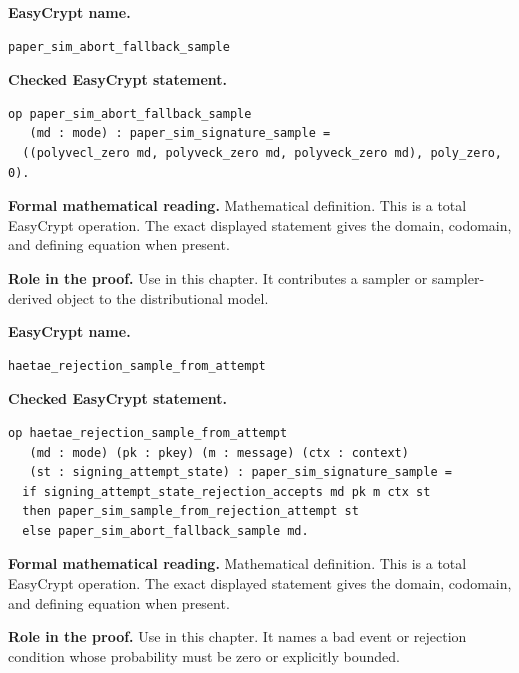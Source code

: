 \begin{formaldefinition}
\noindent\textbf{EasyCrypt name.}
\begin{lstlisting}[language=EasyCrypt,basicstyle=\ttfamily\scriptsize]
paper_sim_abort_fallback_sample
\end{lstlisting}
\noindent\textbf{Checked EasyCrypt statement.}
\begin{lstlisting}[language=EasyCrypt,basicstyle=\ttfamily\scriptsize]
op paper_sim_abort_fallback_sample
   (md : mode) : paper_sim_signature_sample =
  ((polyvecl_zero md, polyveck_zero md, polyveck_zero md), poly_zero, 0).
\end{lstlisting}
\noindent\textbf{Formal mathematical reading.}
Mathematical definition. This is a total EasyCrypt operation.  The exact displayed statement gives the domain, codomain, and defining equation when present.

\noindent\textbf{Role in the proof.}
Use in this chapter. It contributes a sampler or sampler-derived object to the distributional model.

\end{formaldefinition}

\begin{formaldefinition}
\noindent\textbf{EasyCrypt name.}
\begin{lstlisting}[language=EasyCrypt,basicstyle=\ttfamily\scriptsize]
haetae_rejection_sample_from_attempt
\end{lstlisting}
\noindent\textbf{Checked EasyCrypt statement.}
\begin{lstlisting}[language=EasyCrypt,basicstyle=\ttfamily\scriptsize]
op haetae_rejection_sample_from_attempt
   (md : mode) (pk : pkey) (m : message) (ctx : context)
   (st : signing_attempt_state) : paper_sim_signature_sample =
  if signing_attempt_state_rejection_accepts md pk m ctx st
  then paper_sim_sample_from_rejection_attempt st
  else paper_sim_abort_fallback_sample md.
\end{lstlisting}
\noindent\textbf{Formal mathematical reading.}
Mathematical definition. This is a total EasyCrypt operation.  The exact displayed statement gives the domain, codomain, and defining equation when present.

\noindent\textbf{Role in the proof.}
Use in this chapter. It names a bad event or rejection condition whose probability must be zero or explicitly bounded.

\end{formaldefinition}

